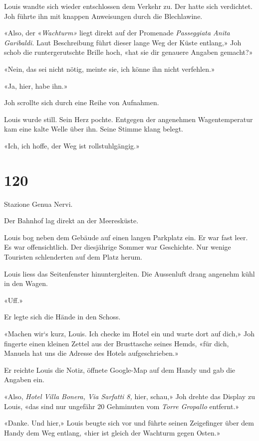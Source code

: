 Louis wandte sich wieder entschlossen dem Verkehr zu. Der hatte sich
verdichtet. Joh führte ihn mit knappen Anweisungen durch die
Blechlawine.

«Also, der «\emph{Wachturm»} liegt direkt auf der Promenade
\emph{Passeggiata Anita Garibaldi.} Laut Beschreibung führt dieser lange
Weg der Küste entlang,» Joh schob die runtergerutschte Brille hoch, «hat
sie dir genauere Angaben gemacht?»

«Nein, das sei nicht nötig, meinte sie, ich könne ihn nicht verfehlen.»

«Ja, hier, habe ihn.»

Joh scrollte sich durch eine Reihe von Aufnahmen.

Louis wurde still. Sein Herz pochte. Entgegen der angenehmen
Wagentemperatur kam eine kalte Welle über ihn. Seine Stimme klang
belegt.

«Ich, ich hoffe, der Weg ist rollstuhlgängig.»

\chapter{120}\label{section-120}

Stazione Genua Nervi.

Der Bahnhof lag direkt an der Meeresküste.

Louis bog neben dem Gebäude auf einen langen Parkplatz ein. Er war fast
leer. Es war offensichtlich. Der diesjährige Sommer war Geschichte. Nur
wenige Touristen schlenderten auf dem Platz herum.

Louis liess das Seitenfenster hinuntergleiten. Die Aussenluft drang
angenehm kühl in den Wagen.

«Uff.»

Er legte sich die Hände in den Schoss.

«Machen wir`s kurz, Louis. Ich checke im Hotel ein und warte dort auf
dich,» Joh fingerte einen kleinen Zettel aus der Brusttasche seines
Hemds, «für dich, Manuela hat uns die Adresse des Hotels
aufgeschrieben.»

Er reichte Louis die Notiz, öffnete Google-Map auf dem Handy und gab die
Angaben ein.

«Also, \emph{Hotel Villa Bonera, Via Sarfatti 8,} hier, schau,» Joh
drehte das Display zu Louis, «das sind nur ungefähr 20 Gehminuten vom
\emph{Torre Gropallo} entfernt.»

«Danke. Und hier,» Louis beugte sich vor und führte seinen Zeigefinger
über dem Handy dem Weg entlang, «hier ist gleich der Wachturm gegen
Osten.»

